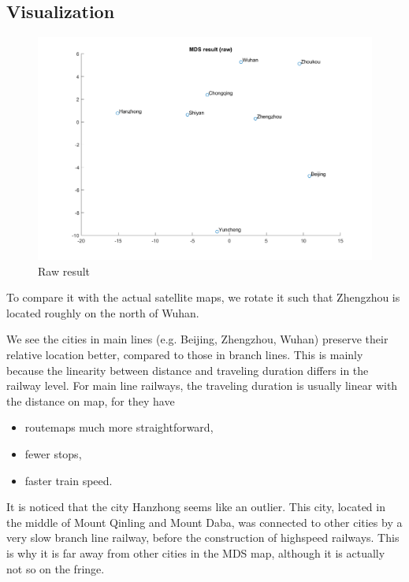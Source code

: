 \documentclass{article}
\begin{document}
{    \subsection*{Visualization}
    {
        \begin{figure}[H]
            \centering
            \includegraphics[width = 1\linewidth]{Q1/result.png}
            \caption{Raw result}
        \end{figure}

        To compare it with the actual satellite maps, we rotate it such that Zhengzhou is located roughly on the north of Wuhan.

        We see the cities in main lines (e.g. Beijing, Zhengzhou, Wuhan) preserve their relative location better, compared to those in branch lines. 
        This is mainly because the linearity between distance and traveling duration differs in the railway level. For main line railways, the traveling duration is usually linear with the distance on map, for they have
        \begin{itemize}
            \item routemaps much more straightforward,
            \item fewer stops,
            \item faster train speed.
        \end{itemize}

        It is noticed that the city Hanzhong seems like an outlier. This city, located in the middle of Mount Qinling and Mount Daba, was connected to other cities by a very slow branch line railway, before the construction of highspeed railways. This is why it is far away from other cities in the MDS map, although it is actually not so on the fringe.

}}
\end{document}
